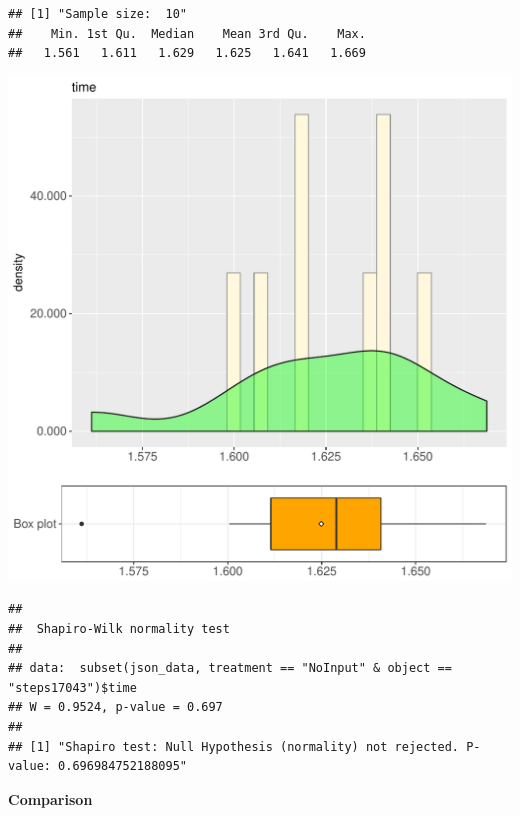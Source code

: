 \documentclass{article}\usepackage[]{graphicx}\usepackage[]{color}
\makeatletter
\def\maxwidth{ %
  \ifdim\Gin@nat@width>\linewidth
    \linewidth
  \else
    \Gin@nat@width
  \fi
}
\newenvironment{kframe}{%
 \def\at@end@of@kframe{}%
 \ifinner\ifhmode%
  \def\at@end@of@kframe{\end{minipage}}%
  \begin{minipage}{\columnwidth}%
 \fi\fi%
 \def\FrameCommand##1{\hskip\@totalleftmargin \hskip-\fboxsep
 \colorbox{shadecolor}{##1}\hskip-\fboxsep
     \hskip-\linewidth \hskip-\@totalleftmargin \hskip\columnwidth}%
 \MakeFramed {\advance\hsize-\width
   \@totalleftmargin\z@ \linewidth\hsize
   \@setminipage}}%
 {\par\unskip\endMakeFramed%
 \at@end@of@kframe}
\newenvironment{knitrout}{}{} %
\makeatother
\begin{document}
\begin{knitrout}
\color{fgcolor}\begin{kframe}
\begin{verbatim}
## [1] "Sample size:  10"
##    Min. 1st Qu.  Median    Mean 3rd Qu.    Max. 
##   1.561   1.611   1.629   1.625   1.641   1.669
\end{verbatim}
\end{kframe}
\includegraphics[width=\maxwidth]{figure/RH4_NoInput_steps17043-1} 
\begin{kframe}\begin{verbatim}
## 
## 	Shapiro-Wilk normality test
## 
## data:  subset(json_data, treatment == "NoInput" & object == "steps17043")$time
## W = 0.9524, p-value = 0.697
## 
## [1] "Shapiro test: Null Hypothesis (normality) not rejected. P-value: 0.696984752188095"
\end{verbatim}
\end{kframe}
\end{knitrout}
  
 \textbf{Comparison}
  
\end{document}
